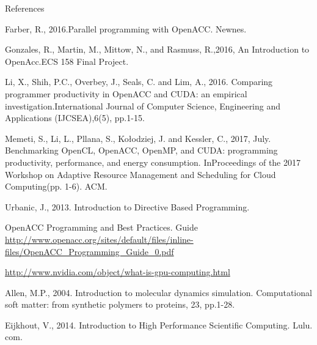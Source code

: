 \documentclass[aspectratio=169]{beamer}
\begin{document}
\begin{frame}[fragile]{References}

\begin{itemize}
\small{\item Farber, R., 2016.Parallel programming with OpenACC. Newnes.
\item Gonzales, R.,  Martin, M., Mittow, N., and Rasmuss, R.,2016, An Introduction to OpenAcc.ECS 158 Final Project.
\item Li, X., Shih, P.C., Overbey, J., Seals, C. and Lim, A., 2016. Comparing programmer productivity in OpenACC and CUDA: an empirical investigation.International Journal of Computer Science, Engineering and Applications (IJCSEA),6(5), pp.1-15.
\item Memeti, S., Li, L., Pllana, S., Kołodziej, J. and Kessler, C., 2017, July. Benchmarking OpenCL, OpenACC, OpenMP, and CUDA: programming productivity, performance, and energy consumption. InProceedings of the 2017 Workshop on Adaptive Resource Management and Scheduling for Cloud Computing(pp. 1-6). ACM.
\item Urbanic, J., 2013. Introduction to Directive Based Programming.
\item OpenACC Programming and Best Practices. Guide \url{http://www.openacc.org/sites/default/files/inline-files/OpenACC_Programming_Guide_0.pdf}
\item \url{http://www.nvidia.com/object/what-is-gpu-computing.html}}
\item Allen, M.P., 2004. Introduction to molecular dynamics simulation. Computational soft matter: from synthetic polymers to proteins, 23, pp.1-28.
\item Eijkhout, V., 2014. Introduction to High Performance Scientific Computing. Lulu. com.
\end{itemize}

\end{frame}
\end{document}
